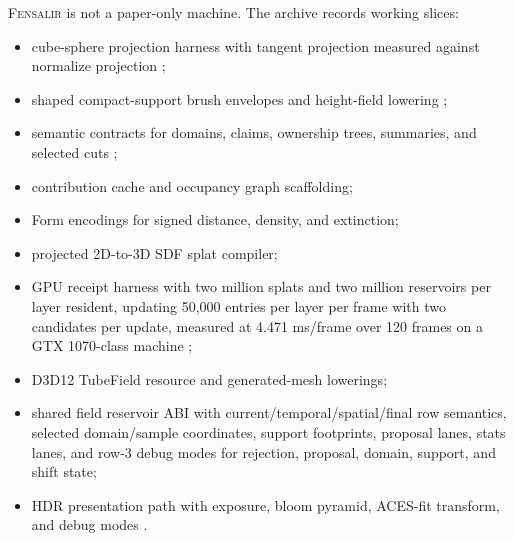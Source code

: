 \documentclass[11pt]{article}
\newcommand{\Fensalir}{\textsc{Fensalir}}
\begin{document}
\Fensalir{} is not a paper-only machine.  The archive records working slices:

\begin{itemize}[leftmargin=1.5em]
  \item cube-sphere projection harness with tangent projection measured against
  normalize projection \cite{fensalirProjectionReport};
  \item shaped compact-support brush envelopes and height-field lowering
  \cite{fensalirFractalRoadmap};
  \item semantic contracts for domains, claims, ownership trees, summaries, and
  selected cuts \cite{fensalirArchitecturePlan};
  \item contribution cache and occupancy graph scaffolding;
  \item Form encodings for signed distance, density, and extinction;
  \item projected 2D-to-3D SDF splat compiler;
  \item GPU receipt harness with two million splats and two million reservoirs
  per layer resident, updating 50,000 entries per layer per frame with two
  candidates per update, measured at 4.471 ms/frame over 120 frames on a GTX
  1070-class machine \cite{fensalirPerfectMachine};
  \item D3D12 TubeField resource and generated-mesh lowerings;
  \item shared field reservoir ABI with current/temporal/spatial/final row
  semantics, selected domain/sample coordinates, support footprints, proposal
  lanes, stats lanes, and row-3 debug modes for rejection, proposal, domain,
  support, and shift state;
  \item HDR presentation path with exposure, bloom pyramid, ACES-fit transform,
  and debug modes \cite{fensalirHDR}.
\end{itemize}
\end{document}
